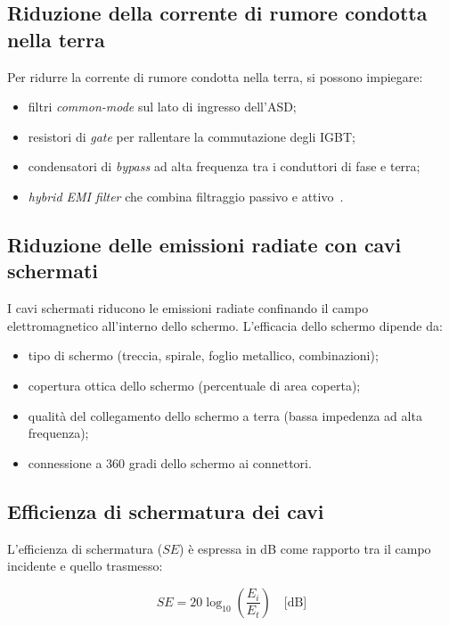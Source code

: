 \subsection{Riduzione della corrente di rumore condotta nella terra}

Per ridurre la corrente di rumore condotta nella terra, si possono impiegare:

\begin{itemize}
\item filtri \textit{common-mode} sul lato di ingresso dell'ASD;
\item resistori di \textit{gate} per rallentare la commutazione degli IGBT;
\item condensatori di \textit{bypass} ad alta frequenza tra i conduttori di fase e terra;
\item \textit{hybrid EMI filter} che combina filtraggio passivo e attivo~\cite{wang2008}.
\end{itemize}

\subsection{Riduzione delle emissioni radiate con cavi schermati}

I cavi schermati riducono le emissioni radiate confinando il campo elettromagnetico all'interno dello schermo. L'efficacia dello schermo dipende da:

\begin{itemize}
\item tipo di schermo (treccia, spirale, foglio metallico, combinazioni);
\item copertura ottica dello schermo (percentuale di area coperta);
\item qualità del collegamento dello schermo a terra (bassa impedenza ad alta frequenza);
\item connessione a 360 gradi dello schermo ai connettori.
\end{itemize}

\subsection{Efficienza di schermatura dei cavi}

L'efficienza di schermatura ($SE$) è espressa in dB come rapporto tra il campo incidente e quello trasmesso:

\begin{equation}
SE = 20 \log_{10} \left( \frac{E_i}{E_t} \right) \quad \text{[dB]}
\end{equation}

